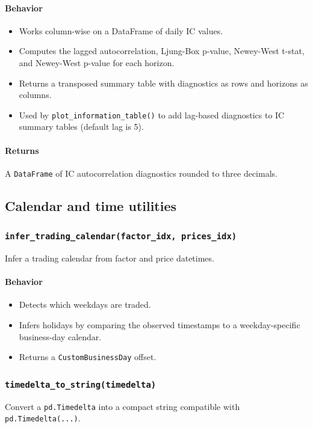 \documentclass[11pt]{article}
\begin{document}
\paragraph{Behavior}
\begin{itemize}
  \item Works column-wise on a DataFrame of daily IC values.
  \item Computes the lagged autocorrelation, Ljung-Box p-value, Newey-West t-stat, and Newey-West p-value for each horizon.
  \item Returns a transposed summary table with diagnostics as rows and horizons as columns.
  \item Used by \texttt{plot\_information\_table()} to add lag-based diagnostics to IC summary tables (default lag is 5).
\end{itemize}

\paragraph{Returns}
A \texttt{DataFrame} of IC autocorrelation diagnostics rounded to three decimals.

\subsection{Calendar and time utilities}

\subsubsection{\texttt{infer\_trading\_calendar(factor\_idx, prices\_idx)}}
Infer a trading calendar from factor and price datetimes.

\paragraph{Behavior}
\begin{itemize}
  \item Detects which weekdays are traded.
  \item Infers holidays by comparing the observed timestamps to a weekday-specific business-day calendar.
  \item Returns a \texttt{CustomBusinessDay} offset.
\end{itemize}

\subsubsection{\texttt{timedelta\_to\_string(timedelta)}}
Convert a \texttt{pd.Timedelta} into a compact string compatible with \texttt{pd.Timedelta(...)}.
\end{document}
